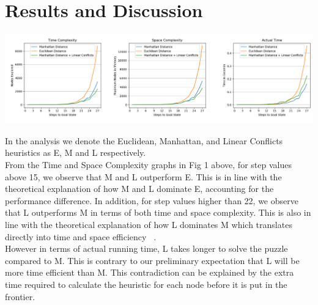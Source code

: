 \documentclass[runningheads]{llncs}
\begin{document}
\section{Results and Discussion}
\begin{centering}
    \includegraphics[width=\textwidth]{Figure_1.png}
\end{centering}
In the analysis we denote the Euclidean, Manhattan, and Linear Conflicts heuristics as E, M and L respectively. \\
From the Time and Space Complexity graphs in Fig 1 above, for step values above 15, we observe that M and L outperform E. This is in line with the theoretical explanation of how M and L dominate E, accounting for the performance difference. In addition, for step values higher than 22, we observe that L outperforms M in terms of both time and space complexity. This is also in line with the theoretical explanation of how L dominates M which translates directly into time and space efficiency ~\cite[p104]{stuart_russell_artifical_2010}.\\
However in terms of actual running time, L takes longer to solve the puzzle compared to M.  This is contrary to our preliminary expectation that L will be more time efficient than M. This contradiction can be explained by the extra time required to calculate the heuristic for each node before it is put in the frontier.
%
%
%
\pagebreak



\appendix
\end{document}
